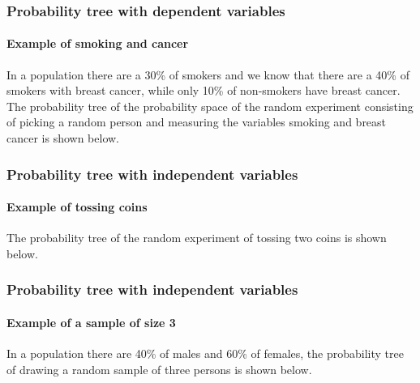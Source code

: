\begin{frame}
\frametitle{Probability tree with dependent variables}
\framesubtitle{Example of smoking and cancer}
In a population there are a 30\% of smokers and we know that there are a 40\% of smokers with breast cancer, while only 10\% of non-smokers have breast cancer. 
The probability tree of the probability space of the random experiment consisting of picking a random person and
measuring the variables smoking and breast cancer is shown below.  
\begin{center}
\end{center}
\end{frame}


\begin{frame}
\frametitle{Probability tree with independent variables}
\framesubtitle{Example of tossing coins}
The probability tree of the random experiment of tossing two coins is shown below.
\begin{center}
\end{center}
\end{frame}


\begin{frame}
\frametitle{Probability tree with independent variables}
\framesubtitle{Example of a sample of size 3}
In a population there are 40\% of males and 60\% of females, the probability tree of drawing a random sample of three persons is shown below.
\begin{center}
\end{center}
\end{frame}


